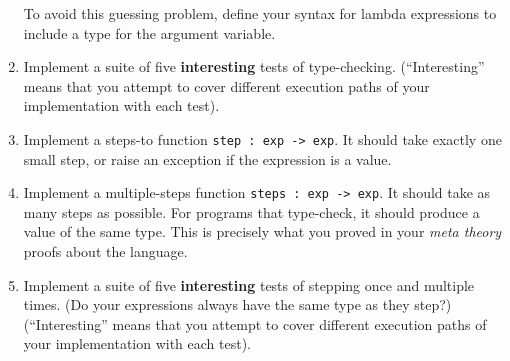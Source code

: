 \documentclass[11pt]{article}
\begin{document}
\begin{enumerate}
  To avoid this guessing problem, define your syntax for lambda
  expressions to include a type for the argument variable.

\item Implement a suite of five \textbf{interesting} tests of type-checking.  
(``Interesting'' means that you attempt to cover different execution paths of your implementation with each test).
%

\item Implement a steps-to function \texttt{step : exp -> exp}. It
  should take exactly one small step, or raise an exception if the
  expression is a value.

\item Implement a multiple-steps function \texttt{steps : exp ->
  exp}. It should take as many steps as possible.  For programs that
  type-check, it should produce a value of the same type.  This is
  precisely what you proved in your \emph{meta theory} proofs about
  the language.

\item Implement a suite of five \textbf{interesting} tests of stepping once and multiple times.  
  (Do your expressions always have the same type as they step?)
(``Interesting'' means that you attempt to cover different execution paths of your implementation with each test).
%

\end{enumerate}
\end{document}

